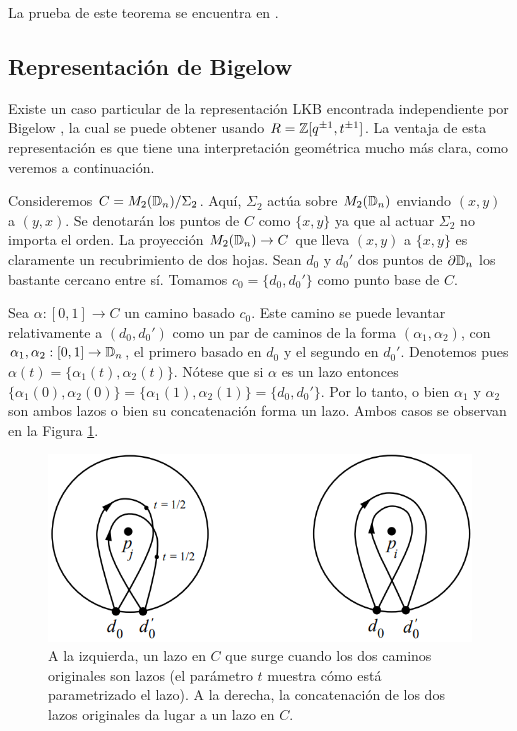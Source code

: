\documentclass[TFG.tex]{subfiles}
\begin{document}
La prueba de este teorema se encuentra en \cite{Krammer}.


\subsection{Representación de Bigelow}
Existe un caso particular de la representación LKB encontrada independiente por Bigelow \cite{Bil}, la cual se puede obtener usando $R=\mathbb{Z}[q^{\pm 1},t^{\pm 1}]$. La ventaja de esta representación es que tiene una interpretación geométrica mucho más clara, como veremos a continuación.

Consideremos $C=M_2(\mathbb{D}_n)/\Sigma_2$. Aquí, $\Sigma_2$ actúa sobre $M_2(\mathbb{D}_n)$ enviando $(x,y)$ a $(y,x)$. Se denotarán los puntos de $C$ como $\{x,y\}$ ya que al actuar $\Sigma_2$ no importa el orden. La proyección $M_2(\mathbb{D}_n)\to C$ que lleva $(x,y)$ a $\{x,y\}$ es claramente un recubrimiento de dos hojas. Sean $d_0$ y $d_0'$ dos puntos de $\partial\mathbb{D}_n$ los bastante cercano entre sí. Tomamos $c_0=\{d_0,d_0'\}$ como punto base de $C$.


Sea $\alpha:[0,1]\to C$ un camino basado $c_0$. Este camino se puede levantar relativamente a $(d_0,d_0')$ como un par de caminos de la forma $(\alpha_1,\alpha_2)$, con$ \alpha_1,\alpha_2:[0,1]\to\mathbb{D}_n$, el primero basado en $d_0$ y el segundo en $d_0'$. Denotemos pues $\alpha(t)=\{\alpha_1(t),\alpha_2(t)\}$. Nótese que si $\alpha$ es un lazo entonces $\{\alpha_1(0),\alpha_2(0)\}=\{\alpha_1(1),\alpha_2(1)\}=\{d_0,d_0'\}$. Por lo tanto, o bien $\alpha_1$ y $\alpha_2$ son ambos lazos o bien su concatenación forma un lazo. Ambos casos se observan en la Figura \ref{loop}. 

\begin{figure}[h!]
\includegraphics[scale=0.6]{Imagenes/loop}
\caption{A la izquierda, un lazo en $C$ que surge cuando los dos caminos originales son lazos (el parámetro $t$ muestra cómo está parametrizado el lazo). A la derecha, la concatenación de los dos lazos originales da lugar a un lazo en $C$.}\label{loop}
\end{figure}
\end{document}
